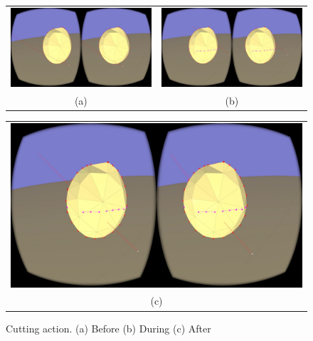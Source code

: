 \begin{figure}[!h]
    \centering
    \setlength{\tabcolsep}{0.0130\linewidth}
    \begin{tabular}{@{}cc@{}}
    \includegraphics[width=0.45\linewidth]{figures/pre_cut} &
       	\includegraphics[width=0.45\linewidth]{figures/during_cut} \\
       	(a)&(b)\\
       	\end{tabular}
       	
       	  \centering
    \setlength{\tabcolsep}{0.0130\linewidth}
    \begin{tabular}{@{}c@{}}
    \includegraphics[width=0.926\linewidth]{figures/post_cut}\\
    (c)
    \end{tabular}
    \caption[Cutting action]{Cutting action.
    	  \textup{(a)} Before \textup{(b)} During \textup{(c)} After
      \label{fig:cut_example}}
\end{figure}

